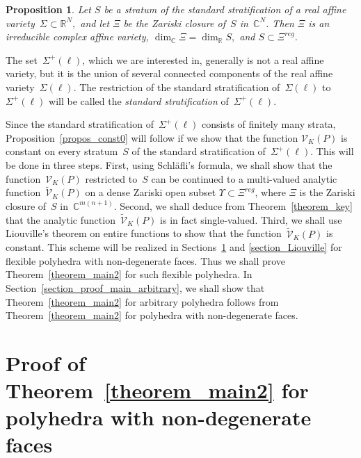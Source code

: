 \documentclass[reqno,tbtags,12pt]{amsart}
\numberwithin{equation}{section}
\newcommand{\R}{\mathbb{R}}
\newcommand{\C}{\mathbb{C}}
\newcommand{\CV}{\mathcal{V}}
\newcommand{\tCV}{\widetilde{\mathcal{V}}}
\newcommand{\bell}{\boldsymbol{\ell}}
\newtheorem{propos}[theorem]{Proposition}
\theoremstyle{definition}
\begin{document}
\begin{propos}\label{propos_strat}
Let $S$ be a stratum of the standard stratification of a real affine variety~$\Sigma\subset\R^N,$ and let $\Xi$ be the Zariski closure of~$S$ in~$\C^N$. Then $\Xi$ is an irreducible complex affine variety, $\dim_{\C}\Xi=\dim_{\R}S,$ and $S\subset \Xi^{reg}$. 
\end{propos}





The set~$\Sigma^+(\bell)$, which we are interested in, generally is not a real affine variety, but it is the union of several connected components of the real affine variety~$\Sigma(\bell)$. The restriction of the standard stratification of~$\Sigma(\bell)$ to~$\Sigma^+(\bell)$ will be called the \textit{standard stratification\/} of~$\Sigma^+(\bell)$.  

Since the standard stratification of~$\Sigma^+(\bell)$ consists of finitely many strata, Proposition~\ref{propos_const0}  will follow if we show that  the  function $\CV_K( P)$ is constant on every stratum~$S$ of the standard stratification of~$\Sigma^+(\bell)$. 
This will be done in three steps. First, using Schl\"afli's formula, we shall show that the function~$\CV_K( P)$ restricted to~$S$ can be  continued to a multi-valued analytic function~$\tCV_K( P)$ on a dense Zariski open subset $\Upsilon\subset \Xi^{reg}$, where $\Xi$ is the Zariski closure of~$S$ in~$\C^{m(n+1)}$. Second, we shall deduce from Theorem~\ref{theorem_key} that the analytic function~$\tCV_K( P)$ is in fact single-valued. Third, we shall use Liouville's theorem on entire functions  
to show that the function~$\tCV_K( P)$ is constant. This scheme will be realized in Sections~\ref{section_proof_main} and \ref{section_Liouville} for flexible polyhedra with non-degenerate faces. Thus we shall prove Theorem~\ref{theorem_main2} for such flexible polyhedra. In Section~\ref{section_proof_main_arbitrary}, we shall show that Theorem~\ref{theorem_main2} for arbitrary polyhedra follows from Theorem~\ref{theorem_main2} for polyhedra with non-degenerate faces.








\section{Proof of Theorem~\ref{theorem_main2} for polyhedra with non-degenerate faces}\label{section_proof_main}
\end{document}
